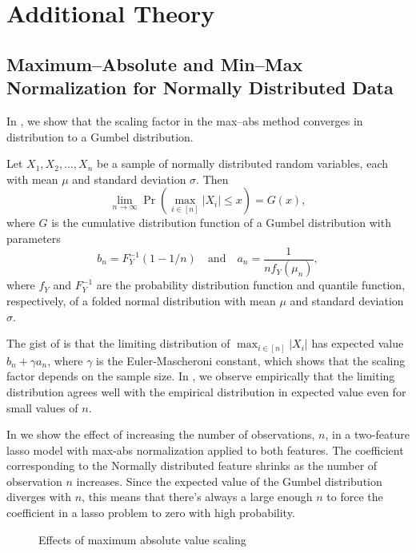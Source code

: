 \section{Additional Theory}

\subsection{Maximum--Absolute and Min--Max Normalization for Normally Distributed Data}%
\label{sec:maxabs-theory}

In , we show that the scaling factor in the max--abs method converges
in distribution to a Gumbel distribution.

\begin{theorem}
  \label{thm:maxabs-gev}
  Let \(X_1, X_2, \dots, X_n\) be a sample of normally distributed random variables, each with mean \(\mu\) and standard deviation \(\sigma\). Then
  \[
    \lim_{n \rightarrow \infty}\Pr\left(\max_{i \in [n]} |X_i| \leq x\right) = G(x),
  \]
  where \(G\) is the cumulative distribution function of a Gumbel distribution with
  parameters
  \[
    b_n = F_Y^{-1}(1 - 1/n)\quad \text{and} \quad a_n = \frac{1}{n f_Y(\mu_n)},
  \]
  where \(f_Y\) and \(F_Y^{-1}\) are the probability distribution function and quantile
  function, respectively, of a folded normal distribution with mean \(\mu\) and standard
  deviation \(\sigma\).
\end{theorem}

The gist of  is that the limiting distribution of \(\max_{i \in
  [n]}|X_i|\) has expected value \(b_n + \gamma a_n\), where \(\gamma\) is the
Euler-Mascheroni constant, which shows that the scaling factor depends on the sample size.
In , we observe empirically that the limiting distribution agrees well
with the empirical distribution in expected value even for small values of \(n\).

In  we show the effect of increasing the number of observations, \(n\),
in a two-feature lasso model with max-abs normalization applied to both features. The
coefficient corresponding to the Normally distributed feature shrinks as the number of
observation \(n\) increases. Since the expected value of the Gumbel distribution diverges
with \(n\), this means that there's always a large enough \(n\) to force the coefficient in
a lasso problem to zero with high probability.

\begin{figure}[htpb]
  \centering
  \hspace{1cm}
  \caption{%
    Effects of maximum absolute value scaling
  }
\end{figure}

